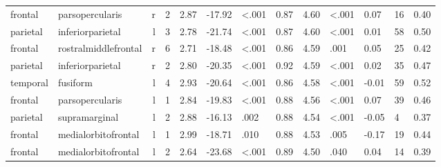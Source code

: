 \documentclass{article}
\begin{document}
\begin{longtable}{llrR{1.3cm}R{1cm}R{1.3cm}R{1cm}R{1cm}R{1.3cm}R{1cm}R{1.8cm}R{1.3cm}R{1.8cm}}
   frontal &           parsopercularis &    r &         2 &                  2.87 &           -17.92 &      \textless.001 &                               0.87 &                          4.60 &                   \textless.001 &   0.07 &     16 &      0.40 \\
  parietal &          inferiorparietal &    l &         3 &                  2.78 &           -21.74 &      \textless.001 &                               0.87 &                          4.60 &                   \textless.001 &   0.01 &     58 &      0.50 \\
   frontal &      rostralmiddlefrontal &    r &         6 &                  2.71 &           -18.48 &      \textless.001 &                               0.86 &                          4.59 &                            .001 &   0.05 &     25 &      0.42 \\
  parietal &          inferiorparietal &    r &         2 &                  2.80 &           -20.35 &      \textless.001 &                               0.92 &                          4.59 &                   \textless.001 &   0.02 &     35 &      0.47 \\
  temporal &                  fusiform &    l &         4 &                  2.93 &           -20.64 &      \textless.001 &                               0.86 &                          4.58 &                   \textless.001 &  -0.01 &     59 &      0.52 \\
   frontal &           parsopercularis &    l &         1 &                  2.84 &           -19.83 &      \textless.001 &                               0.88 &                          4.56 &                   \textless.001 &   0.07 &     39 &      0.46 \\
  parietal &             supramarginal &    l &         2 &                  2.88 &           -16.13 &               .002 &                               0.88 &                          4.54 &                   \textless.001 &  -0.05 &      4 &      0.37 \\
   frontal &       medialorbitofrontal &    l &         1 &                  2.99 &           -18.71 &               .010 &                               0.88 &                          4.53 &                            .005 &  -0.17 &     19 &      0.44 \\
   frontal &       medialorbitofrontal &    l &         2 &                  2.64 &           -23.68 &      \textless.001 &                               0.89 &                          4.50 &                            .040 &   0.04 &     14 &      0.39 \\

\end{longtable}
\end{document}
